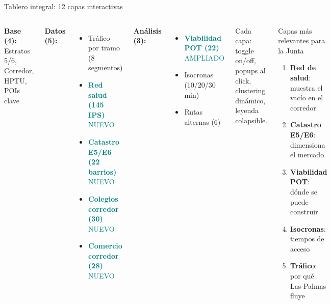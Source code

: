 \documentclass[aspectratio=169, 11pt]{beamer}
\newcommand{\highlight}[1]{\textcolor{teal}{\textbf{#1}}}
\begin{document}
\begin{frame}{Tablero integral: 12 capas interactivas}

\begin{columns}[T]
{\footnotesize\textbf{Base (4):} Estratos 5/6, Corredor, HPTU, POIs clave}

\vspace{4pt}
{\footnotesize\textbf{Datos (5):}}
\begin{itemize}\scriptsize
  \item[\textcolor{amber}{$\bullet$}] Tráfico por tramo (8 segmentos)
  \item[\textcolor{coral}{$\bullet$}] \highlight{Red salud (145 IPS)} {\tiny\textcolor{teal}{NUEVO}}
  \item[\textcolor{hptu}{$\bullet$}] \highlight{Catastro E5/E6 (22 barrios)} {\tiny\textcolor{teal}{NUEVO}}
  \item[\textcolor{violet}{$\bullet$}] \highlight{Colegios corredor (30)} {\tiny\textcolor{teal}{NUEVO}}
  \item[\textcolor{amber}{$\bullet$}] \highlight{Comercio corredor (28)} {\tiny\textcolor{teal}{NUEVO}}
\end{itemize}

\vspace{2pt}
{\footnotesize\textbf{Análisis (3):}}
\begin{itemize}\scriptsize
  \item[\textcolor{green}{$\bullet$}] \highlight{Viabilidad POT (22)} {\tiny\textcolor{teal}{AMPLIADO}}
  \item[\textcolor{amber}{$\bullet$}] Isocronas (10/20/30 min)
  \item[\textcolor{hptu}{$\bullet$}] Rutas alternas (6)
\end{itemize}

\vspace{4pt}
{\footnotesize Cada capa: toggle on/off, popups al click, clustering dinámico, leyenda colapsible.}

\begin{block}{\small Capas más relevantes para la Junta}
\footnotesize
\begin{enumerate}\footnotesize
  \item \textbf{Red de salud}: muestra el vacío en el corredor
  \item \textbf{Catastro E5/E6}: dimensiona el mercado
  \item \textbf{Viabilidad POT}: dónde se puede construir
  \item \textbf{Isocronas}: tiempos de acceso
  \item \textbf{Tráfico}: por qué Las Palmas fluye
\end{enumerate}
\end{block}


\end{columns}
\end{frame}
\end{document}
